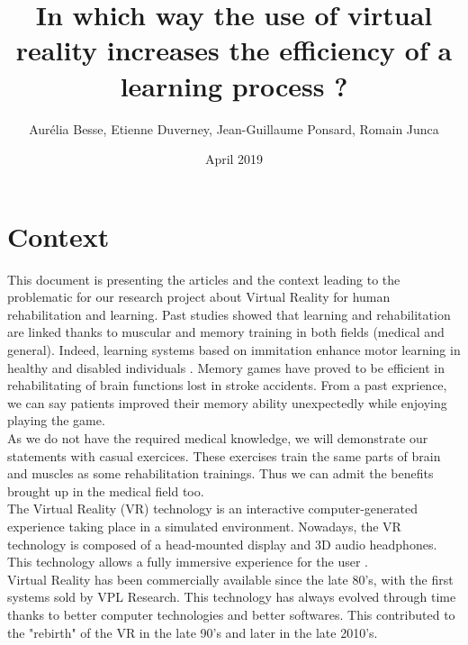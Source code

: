 \documentclass[12pt, openany, twocolumn]{article}
\title{In which way the use of virtual reality increases the efficiency of a learning process ?}
\author{ Aurélia Besse, Etienne Duverney, Jean-Guillaume Ponsard, Romain Junca }
\date{April 2019}
\begin{document}
\maketitle

\section{Context} 
\hspace{0.5cm} 
This document is presenting the articles and the context leading to the problematic for our research project about Virtual Reality for human rehabilitation and learning.
Past studies showed that learning and rehabilitation are linked thanks to muscular and memory training in both fields (medical and general). 
Indeed, learning systems based on immitation enhance motor learning in healthy and disabled individuals \cite{holdenUseVirtualEnvironments, bastianUnderstandingSensorimotorAdaptation2008b}.
Memory games have proved to be efficient in rehabilitating of brain functions lost in stroke accidents. From a past exprience, we can say patients improved their memory ability unexpectedly while enjoying playing the game.\\ 

As we do not have the required medical knowledge, we will demonstrate our statements with casual exercices.  
These exercises train the same parts of brain and muscles as some rehabilitation trainings.
Thus we can admit the benefits brought up in the medical field too.
\\

The Virtual Reality (VR) technology is an interactive computer-generated experience taking place in a simulated environment. 
Nowadays, the VR technology is composed of a head-mounted display and 3D audio headphones.
This technology allows a fully immersive experience for the user \cite{sveistrupMotorRehabilitationUsing2004}.
\\

Virtual Reality has been commercially available since the late 80's, with the first systems sold by VPL Research.
This technology has always evolved through time thanks to better computer technologies and better softwares.
This contributed to the "rebirth" of the VR in the late 90's \cite{burdeaVirtualRehabilitationBenefits2003} and later in the late 2010's.
\\
\end{document}
